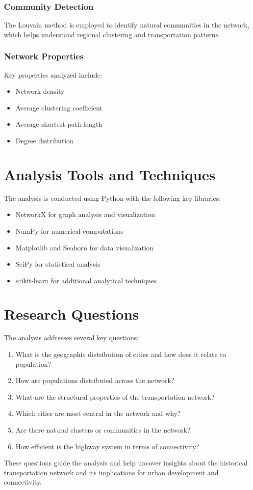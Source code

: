 \subsubsection{Community Detection}
The Louvain method is employed to identify natural communities in the network, which helps understand regional clustering and transportation patterns.

\subsubsection{Network Properties}
Key properties analyzed include:
\begin{itemize}
    \item Network density
    \item Average clustering coefficient
    \item Average shortest path length
    \item Degree distribution
\end{itemize}

\section{Analysis Tools and Techniques}
The analysis is conducted using Python with the following key libraries:
\begin{itemize}
    \item NetworkX for graph analysis and visualization
    \item NumPy for numerical computations
    \item Matplotlib and Seaborn for data visualization
    \item SciPy for statistical analysis
    \item scikit-learn for additional analytical techniques
\end{itemize}

\section{Research Questions}
The analysis addresses several key questions:
\begin{enumerate}
    \item What is the geographic distribution of cities and how does it relate to population?
    \item How are populations distributed across the network?
    \item What are the structural properties of the transportation network?
    \item Which cities are most central in the network and why?
    \item Are there natural clusters or communities in the network?
    \item How efficient is the highway system in terms of connectivity?
\end{enumerate}

These questions guide the analysis and help uncover insights about the historical transportation network and its implications for urban development and connectivity. 